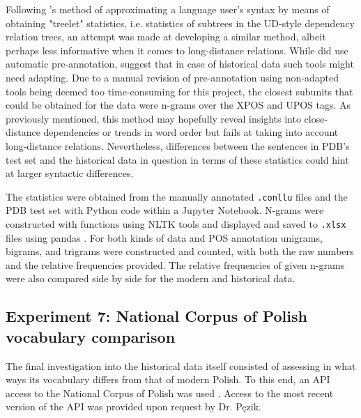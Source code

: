 Following \citet{johannsen-etal-2015-cross}'s method of approximating a language user's syntax by means of obtaining "treelet" statistics, i.e. statistics of subtrees in the UD-style dependency relation trees, an attempt was made at developing a similar method, albeit perhaps less informative when it comes to long-distance relations. While \citet{johannessen-etal-2020-comparing} did use automatic pre-annotation, \citet{regnault-etal-2019-challenges} suggest that in case of historical data such tools might need adapting. Due to a manual revision of pre-annotation using non-adapted tools being deemed too time-consuming for this project, the closest subunits that could be obtained for the data were n-grams over the XPOS and UPOS tags. As previously mentioned, this method may hopefully reveal insights into close-distance dependencies or trends in word order but fails at taking into account long-distance relations. Nevertheless, differences between the sentences in PDB's test set and the historical data in question in terms of these statistics could hint at larger syntactic differences.

The statistics were obtained from the manually annotated \texttt{.conllu} files and the PDB test set with Python code within a Jupyter Notebook. N-grams were constructed with functions using NLTK tools and displayed and saved to \texttt{.xlsx} files using pandas \citep{bird_loper_klein_2009, reback2020pandas, mckinney-proc-scipy-2010}. For both kinds of data and POS annotation unigrams, bigrams, and trigrams were constructed and counted, with both the raw numbers and the relative frequencies provided. The relative frequencies of given n-grams were also compared side by side for the modern and historical data.

\subsection{Experiment 7: National Corpus of Polish vocabulary comparison}
\label{subsec:nkjp-vocab}

The final investigation into the historical data itself consisted of assessing in what ways its vocabulary differs from that of modern Polish. To this end, an API access to the National Corpus of Polish was used \citep{pęzik_2012}. Access to the most recent version of the API was provided upon request by Dr. Pęzik. 

